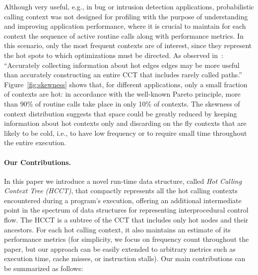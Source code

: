 \documentclass[preprint]{sigplanconf}
\begin{document}
Although very useful, e.g., in bug or intrusion detection applications, probabilistic calling context was not designed for profiling with 
the purpose of understanding and improving application performance, where it is crucial to maintain for each context the sequence of active routine calls along with performance metrics. In this scenario, only the most frequent contexts are of interest, since they represent the hot spots to which optimizations must be directed. As observed in~\cite{ZSCC06}: ``Accurately collecting information about hot edges edges may be more useful than accurately constructing an entire CCT that includes rarely called paths.'' Figure~\ref{fig:skewness} shows that, for different applications, only a small fraction of contexts are hot: in accordance with the well-known Pareto principle, more than 90\% of routine calls take place in only 10\% of contexts. The skewness of context distribution suggests that space could be greatly reduced by keeping information about hot contexts only and discarding on the fly contexts that are likely to be cold, i.e., to have low frequency or to require small time throughout the entire execution. 

\paragraph{Our Contributions.} In this paper we introduce a novel run-time data structure, called {\em Hot Calling Context Tree (HCCT)}, that compactly represents all the hot calling contexts encountered during a program's execution, offering an additional intermediate point in the spectrum of data structures for representing interprocedural control flow. The HCCT is a subtree of the CCT that includes only hot nodes and their ancestors.
For each hot calling context, it also maintains an estimate of its performance metrics (for simplicity, we focus on frequency count throughout the paper, but our approach can be easily extended to arbitrary metrics such as execution time, cache misses, or instruction stalls). Our main contributions can be summarized as follows:
\end{document}
